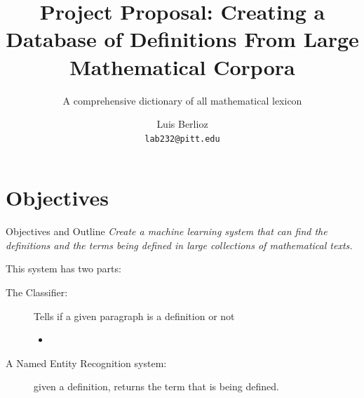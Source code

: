 \documentclass{beamer}
\title{Project Proposal: Creating a Database of Definitions From Large Mathematical Corpora}
\subtitle{A comprehensive dictionary of all mathematical lexicon}
\author{Luis Berlioz\\
\texttt{lab232@pitt.edu}}
\institute{University of Pittsburgh}
\begin{document}
\begin{frame}
\titlepage
\end{frame}
\section{Objectives}
\begin{frame}{Objectives and Outline}
    \textit{Create a machine learning system that can find the definitions and the terms being defined in large collections of mathematical texts. }


    This system has two parts:
\begin{description}
    \item[The Classifier:] Tells if a given paragraph is a definition or not
        \begin{itemize}
                \item 
        \end{itemize}
    \item[A Named Entity Recognition system:] given a definition, returns the term that is being defined.
\end{description}
\end{frame}
\end{document}
